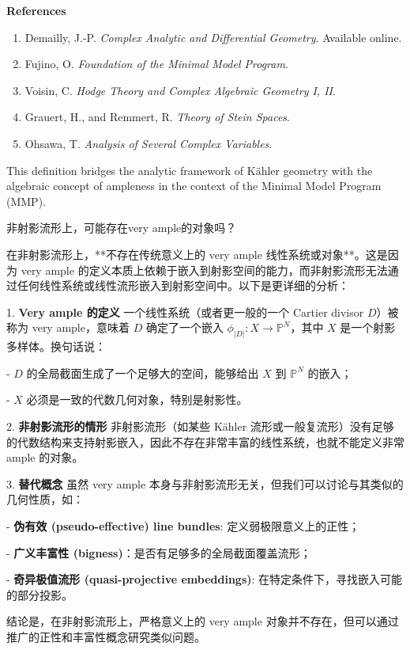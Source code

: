 \documentclass[lang=cn,zihao=-4,a4paper,fontset=none]{beautybook}
\begin{document}
\textbf{References}
\begin{enumerate}
    \item Demailly, J.-P. \emph{Complex Analytic and Differential Geometry}. Available online.  
    \item Fujino, O. \emph{Foundation of the Minimal Model Program}.  
    \item Voisin, C. \emph{Hodge Theory and Complex Algebraic Geometry I, II}.  
    \item Grauert, H., and Remmert, R. \emph{Theory of Stein Spaces}.  
    \item Ohsawa, T. \emph{Analysis of Several Complex Variables}.
\end{enumerate}

This definition bridges the analytic framework of Kähler geometry with the algebraic concept of ampleness in the context of the Minimal Model Program (MMP).



\begin{problem}[][问题2][prob:2]
    非射影流形上，可能存在very ample的对象吗？
\end{problem}
    
\begin{solution}
     
在非射影流形上，**不存在传统意义上的 very ample 线性系统或对象**。这是因为 very ample 的定义本质上依赖于嵌入到射影空间的能力，而非射影流形无法通过任何线性系统或线性流形嵌入到射影空间中。以下是更详细的分析：

1.  \textbf{Very ample 的定义 } 
一个线性系统（或者更一般的一个 Cartier divisor $D$）被称为 very ample，意味着 $D$ 确定了一个嵌入 $\phi_{|D|}: X \to \mathbb{P}^N$，其中 $X$ 是一个射影多样体。换句话说：

- $D$ 的全局截面生成了一个足够大的空间，能够给出 $X$ 到 $\mathbb{P}^N$ 的嵌入；

- $X$ 必须是一致的代数几何对象，特别是射影性。

2.  \textbf{非射影流形的情形} 
非射影流形（如某些 Kähler 流形或一般复流形）没有足够的代数结构来支持射影嵌入，因此不存在非常丰富的线性系统，也就不能定义非常 ample 的对象。

3.  \textbf{替代概念}  
虽然 very ample 本身与非射影流形无关，但我们可以讨论与其类似的几何性质，如：

-  \textbf{伪有效 (pseudo-effective) line bundles}: 定义弱极限意义上的正性；

-  \textbf{广义丰富性 (bigness)}：是否有足够多的全局截面覆盖流形；

-  \textbf{奇异极值流形 (quasi-projective embeddings)}: 在特定条件下，寻找嵌入可能的部分投影。

结论是，在非射影流形上，严格意义上的 very ample 对象并不存在，但可以通过推广的正性和丰富性概念研究类似问题。
\end{solution}
    















\ISBNcode{\EANisbn[ISBN=978-80-7340-097-2]} %
\makebottomcover
\end{document}
